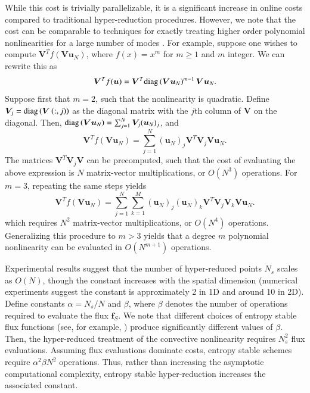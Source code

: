 \documentclass[preprint,10pt]{elsarticle}
\theoremstyle{definition}
\theoremstyle{lemma}
\theoremstyle{theorem}
\theoremstyle{assumption}
\newcommand{\diag}[1]{{\rm diag}\LRp{#1}}
\newcommand{\LRp}[1]{\left( #1 \right)}
\newcommand{\note}[1]{{\color{blue}{#1}}}
\begin{document}
While this cost is trivially parallelizable, it is a significant increase in online costs compared to traditional hyper-reduction procedures.  However, we note that the cost can be comparable to techniques for exactly treating higher order polynomial nonlinearities for a large number of modes \cite{maboudi2018conservative}.  For example, suppose one wishes to compute $\bm{V}^T f\LRp{\bm{V}\bm{u}_N}$, where $f(x) = x^m$ for $m \geq 1$ and $m$ integer.  We can rewrite this as
\[
\bm{V}^T f(\bm{u}) = \bm{V}^T \diag{\bm{V}\bm{u}_N}^{m-1} \bm{V}\bm{u}_N.
\]
Suppose first that $m = 2$, such that the nonlinearity is quadratic.  Define $\bm{V}_j = \diag{\bm{V}\LRp{:,j}}$ as the diagonal matrix with the $j$th column of $\bm{V}$ on the diagonal.  Then, $\diag{\bm{V}\bm{u}_N} = \sum_{j=1}^N\bm{V}_j (\bm{u}_N)_j$, and 
\[
\bm{V}^T f\LRp{\bm{V}\bm{u}_N} = \sum_{j=1}^N (\bm{u}_N)_j \bm{V}^T \bm{V}_j \bm{V}\bm{u}_N.
\]
The matrices $\bm{V}^T \bm{V}_j \bm{V}$ can be precomputed, such that the cost of evaluating the above expression is $N$ matrix-vector multiplications, or $O(N^3)$ operations.  For $m = 3$, repeating the same steps yields
\[
\bm{V}^T f\LRp{\bm{V}\bm{u}_N} = \sum_{j=1}^N \sum_{k=1}^M (\bm{u}_N)_j  (\bm{u}_N)_k \bm{V}^T \bm{V}_j \bm{V}_k \bm{V}\bm{u}_N.
\]
which requires $N^2$ matrix-vector multiplications, or $O(N^4)$ operations.  Generalizing this procedure to $m > 3$ yields that a degree $m$ polynomial nonlinearity can be evaluated in $O(N^{m+1})$ operations.  

Experimental results suggest that the number of hyper-reduced points $N_s$ scales as $O(N)$, though the constant increases with the spatial dimension (numerical experiments suggest the constant is approximately 2 in 1D and around 10 in 2D).  Define constants $\alpha = N_s/ N$ and $\beta$, where $\beta$ denotes the number of operations required to evaluate the flux $\bm{f}_S$.  We note that different choices of entropy stable flux functions (see, for example, \cite{ismail2009affordable, chandrashekar2013kinetic, hicken2018family}) produce significantly different values of $\beta$.  Then, the hyper-reduced treatment of the convective nonlinearity requires $N_s^2$ flux evaluations.  Assuming flux evaluations dominate costs, entropy stable schemes require $\alpha^2 \beta N^2$ operations.  Thus, rather than increasing the asymptotic computational complexity, entropy stable hyper-reduction increases the associated constant.  

\end{document}
